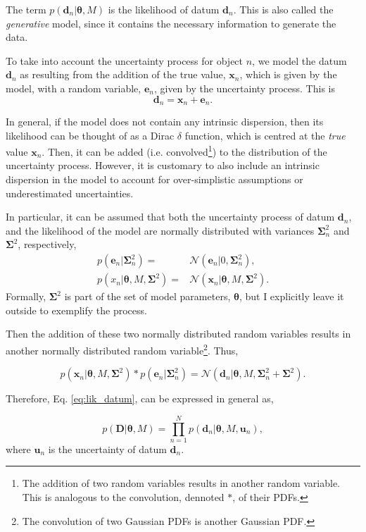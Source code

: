 The term $p(\mathbf{d}_n|\boldsymbol{\theta},M)$ is the likelihood of datum $\mathbf{d}_n$. This is also called the \emph{generative} model, since it contains the necessary information to generate the data. 

{\color{red}
To take into account the uncertainty process for object $n$, we model the datum $\mathbf{d}_n$ as resulting from the addition of the true value, $\mathbf{x}_n$, which is given by the model, with a random variable, $\mathbf{e}_n$, given by the uncertainty process. This is
\begin{equation}
\mathbf{d}_n = \mathbf{x}_n + \mathbf{e}_n. \nonumber
\end{equation}

In general, if the model does not contain any intrinsic dispersion, then its likelihood can be thought of as a Dirac $\delta$ function, which is centred at the \emph{true} value $\mathbf{x}_n$. Then, it can be added (i.e. convolved\footnote{The addition of two random variables results in another random variable. This is analogous  to the convolution, dennoted $*$, of their PDFs.}) to the distribution of the uncertainty process. However, it is customary to also include an intrinsic dispersion in the model to account for over-simplistic assumptions or underestimated uncertainties. 

In particular, it can be assumed that both the uncertainty process of datum $\mathbf{d}_n$, and the likelihood of the model are normally distributed with variances $\boldsymbol{\Sigma}_n^2$ and $\boldsymbol{\Sigma}^2$, respectively, 
\begin{align}
p(\mathbf{e}_n|\mathbf{\Sigma}_n^2)= &\mathcal{N}(\mathbf{e}_n|0,\boldsymbol{\Sigma}_n^2), \nonumber\\
p(x_n|\boldsymbol{\theta},M,\mathbf{\Sigma}^2)= &\mathcal{N}(\mathbf{x}_n|\boldsymbol{\theta},M,\boldsymbol{\Sigma}^2).\nonumber
\end{align}
Formally, $\boldsymbol{\Sigma}^2$ is part of the set of model parameters, $\boldsymbol{\theta}$, but I explicitly leave it outside to exemplify the process. 

Then the addition of these two normally distributed random variables results in another normally distributed random variable\footnote{The convolution of two Gaussian PDFs is another Gaussian PDF.}. Thus,

\begin{equation}
p(\mathbf{x}_n|\boldsymbol{\theta},M,\boldsymbol{\Sigma}^2)*p(\mathbf{e}_n|\boldsymbol{\Sigma}_n^2) = \mathcal{N}(\mathbf{d}_n|\boldsymbol{\theta},M,\boldsymbol{\Sigma}_n^2+\boldsymbol{\Sigma}^2).
\end{equation}

Therefore, Eq. \ref{eq:lik_datum}, can be expressed in general as,

\begin{equation}
\label{eq:lik_generativemodel}
p(\mathbf{D}|\boldsymbol{\theta},M) = \prod_{n=1}^N p(\mathbf{d}_n|\boldsymbol{\theta},M,\mathbf{u}_n),
\end{equation}
where $\mathbf{u}_n$ is the uncertainty of datum $\mathbf{d}_n$.
}

